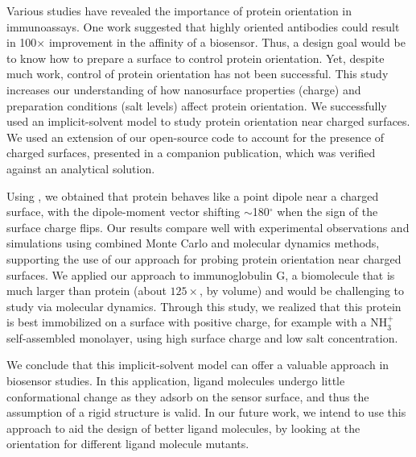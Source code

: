 
Various studies have revealed the importance of protein orientation in immunoassays. One work suggested that highly oriented antibodies could result in 100$\times$ improvement in the affinity of a biosensor.\cite{TajimaTakaiIshihara2011} Thus, a design goal would be to know how to prepare a surface to control protein orientation. Yet, despite much work, control of protein orientation has not been successful.
This study increases our understanding of how nanosurface properties (charge) and preparation conditions (salt levels) affect protein orientation.
We successfully used an implicit-solvent model to study protein orientation near charged surfaces. We used an extension of our open-source \pygbe code to account for the presence of charged surfaces, presented in a companion publication,\cite{CooperBarba2015a} which was verified against an analytical solution. 

Using \pygbe, we obtained that protein \gb behaves like a point dipole near a charged surface, with the dipole-moment vector shifting $\sim$180$^\circ$ when the sign of the surface charge flips. Our results compare well with experimental observations and simulations using combined Monte Carlo and molecular dynamics methods, supporting the use of our approach for probing protein orientation near charged surfaces.
We applied our approach to immunoglobulin G, a biomolecule that is much larger than protein \gb (about $125\times$, by volume) and would be challenging  to study via molecular dynamics. Through this study, we realized that this protein is best immobilized on a surface with positive charge, for example with a NH$^+_3$ self-assembled monolayer, using high surface charge and low salt concentration. 

We conclude that this implicit-solvent model can offer a valuable approach in biosensor studies. In this application, ligand molecules undergo little conformational change as they adsorb on the sensor surface, and thus the assumption of a rigid structure is valid. In our future work, we intend to use this approach to aid the design of better ligand molecules, by looking at the orientation for different ligand molecule mutants. 

